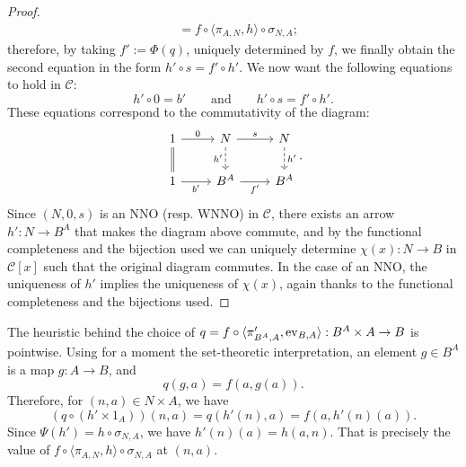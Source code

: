 \begin{proof}
\begin{align*}
                                &= f \circ \langle \pi_{A,N}, h \rangle \circ \sigma_{N,A};
    \end{align*}
    therefore, by taking $f' := \Phi(q)$, uniquely determined by $f$, we finally obtain the second equation in the form $h' \circ s = f' \circ h'$. We now want the following equations to hold in $\mathcal{C}$:
    \[ h' \circ 0 = b' \qquad\text{and}\qquad h' \circ s = f' \circ h'. \]
    These equations correspond to the commutativity of the diagram:
    \[\begin{tikzcd}
        1 & N & N \\
        1 & {B^A} & {B^A}
        \arrow["0", from=1-1, to=1-2]
        \arrow[shift right = 0.20ex, no head, from=1-1, to=2-1]
        \arrow[shift left = 0.20ex, no head, from=1-1, to=2-1]
        \arrow["s", from=1-2, to=1-3]
        \arrow["{h'}"', dashed, from=1-2, to=2-2]
        \arrow["{h'}", dashed, from=1-3, to=2-3]
        \arrow["{b'}"', from=2-1, to=2-2]
        \arrow["{f'}"', from=2-2, to=2-3]
    \end{tikzcd}.\]
    Since $(N,0,s)$ is an NNO (resp. WNNO) in $\mathcal{C}$, there exists an arrow $h' : N \to B^A$ that makes the diagram above commute, and by the functional completeness and the bijection used we can uniquely determine $\chi(x) : N \to B$ in $\mathcal{C}[x]$ such that the original diagram commutes.\newline
    In the case of an NNO, the uniqueness of $h'$ implies the uniqueness of $\chi(x)$, again thanks to the functional completeness and the bijections used.
\end{proof}

\begin{remark}
    The heuristic behind the choice of $q = f \circ \langle \pi_{B^A,A}', \operatorname{ev}_{B,A}\rangle : B^A \times A \to B$ is pointwise. Using for a moment the set-theoretic interpretation, an element $g \in B^A$ is a map $g : A \to B$, and
    \[ q(g,a) = f(a,g(a)). \]
    Therefore, for $(n,a) \in N \times A$, we have
    \[ \left(q \circ (h' \times 1_A)\right)(n,a) = q(h'(n),a) = f(a,h'(n)(a)). \]
    Since $\Psi(h') = h \circ \sigma_{N,A}$, we have $h'(n)(a) = h(a,n)$. That is precisely the value of $f \circ \langle \pi_{A,N}, h \rangle \circ \sigma_{N,A}$ at $(n,a)$.
\end{remark}

